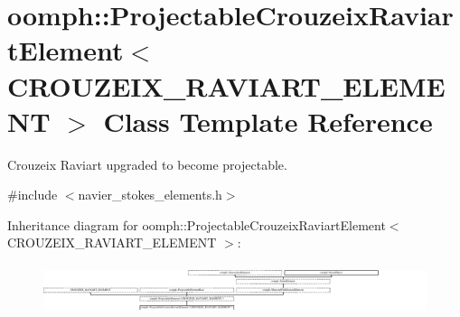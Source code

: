 \hypertarget{classoomph_1_1ProjectableCrouzeixRaviartElement}{}\section{oomph\+:\+:Projectable\+Crouzeix\+Raviart\+Element$<$ C\+R\+O\+U\+Z\+E\+I\+X\+\_\+\+R\+A\+V\+I\+A\+R\+T\+\_\+\+E\+L\+E\+M\+E\+NT $>$ Class Template Reference}
\label{classoomph_1_1ProjectableCrouzeixRaviartElement}


Crouzeix Raviart upgraded to become projectable.  




{\ttfamily \#include $<$navier\+\_\+stokes\+\_\+elements.\+h$>$}

Inheritance diagram for oomph\+:\+:Projectable\+Crouzeix\+Raviart\+Element$<$ C\+R\+O\+U\+Z\+E\+I\+X\+\_\+\+R\+A\+V\+I\+A\+R\+T\+\_\+\+E\+L\+E\+M\+E\+NT $>$\+:\begin{figure}[H]
\begin{center}
\leavevmode
\includegraphics[height=1.476793cm]{classoomph_1_1ProjectableCrouzeixRaviartElement}
\end{center}
\end{figure}
